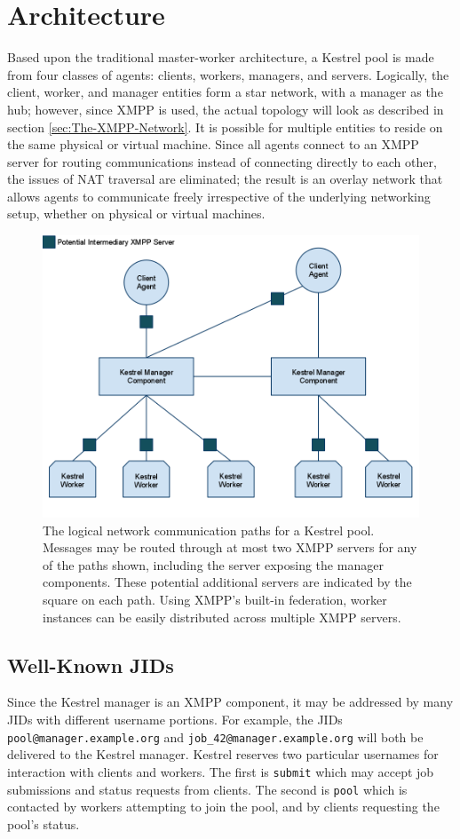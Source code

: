 \section{Architecture}
Based upon the traditional master-worker architecture, a Kestrel pool is made
from four classes of agents: clients, workers, managers, and servers. Logically,
the client, worker, and manager entities form a star network, with a manager as
the hub; however, since XMPP is used, the actual topology will look as described
in section \ref{sec:The-XMPP-Network}. It is possible for multiple entities to
reside on the same physical or virtual machine. Since all agents connect to an
XMPP server for routing communications instead of connecting directly to each
other, the issues of NAT traversal are eliminated; the result is an overlay
network that allows agents to communicate freely irrespective of the underlying
networking setup, whether on physical or virtual machines.

\begin{figure}
\includegraphics[width=\columnwidth]{figures/kestrel_network}
\caption{The logical network communication paths for a Kestrel pool. Messages
may be routed through at most two XMPP servers for any of the paths shown, 
including the server exposing the manager components. These potential additional
servers are indicated by the square on each path. Using XMPP's built-in federation,
worker instances can be easily distributed across multiple XMPP servers.}
\end{figure}

\subsection{Well-Known JIDs}
Since the Kestrel manager is an XMPP component, it may be addressed by many JIDs
with different username portions. For example, the JIDs \texttt{pool@manager.example.org}
and \texttt{job\_42@manager.example.org} will both be delivered to the Kestrel
manager. Kestrel reserves two particular usernames for interaction with clients
and workers. The first is \texttt{submit} which may accept job submissions and
status requests from clients. The second is \texttt{pool} which is contacted
by workers attempting to join the pool, and by clients requesting the pool's
status.

